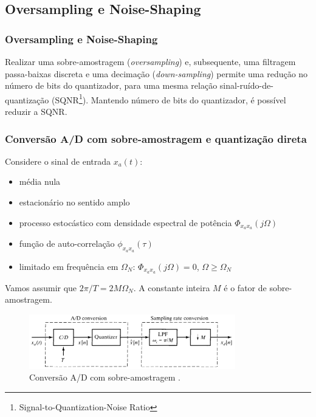 \subsection{Oversampling e Noise-Shaping}


\begin{frame}%
  \frametitle{Oversampling e Noise-Shaping}
  Realizar uma sobre-amostragem (\textit{oversampling}) e, subsequente,
  uma filtragem passa-baixas discreta e uma decimação (\textit{down-sampling})
  permite uma redução no número de bits do quantizador, para uma mesma relação
  sinal-ruído-de-quantização (SQNR\footnote{Signal-to-Quantization-Noise Ratio}). 
  Mantendo número de bits do quantizador, é possível reduzir a SQNR.
\end{frame}

\begin{frame}[allowframebreaks]
  \frametitle{Conversão A/D com sobre-amostragem e quantização direta}
  Considere o sinal de entrada $x_a(t)$:
  \begin{itemize}
  \item média nula
  \item estacionário no sentido amplo 
  \item processo estocástico com densidade espectral de potência $\Phi_{x_a x_a}(j\Omega)$
  \item função de auto-correlação $\phi_{x_a x_a}(\tau)$
  \item limitado em frequência em $\Omega_N$: $\Phi_{x_a x_a}(j\Omega) = 0$, $\Omega \ge \Omega_N$
  \end{itemize}
  Vamos assumir que $2\pi / T = 2 M \Omega_N$. A constante inteira $M$ é o fator de sobre-amostragem.

  \framebreak 

  \begin{figure}[h!]
  \centering
  \includegraphics[width=0.8\textwidth]{images/oppenheim_fig456.png}
  \caption{Conversão A/D com sobre-amostragem \citep{oppenheim2009}.}
  \label{fig:oppenheim_fig456}
  \end{figure}

  \framebreak


\end{frame}
